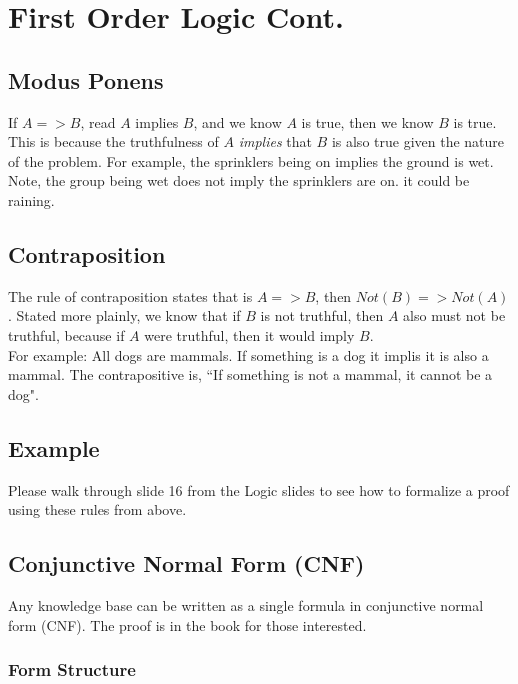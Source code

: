 \documentclass[letterpaper]{article} %
\begin{document}
\section{First Order Logic Cont.}

\subsection{Modus Ponens}

If $A => B$, read $A$ implies $B$, and we know $A$ is true, then we know $B$ is true. This is because the truthfulness of $A$ \textit{implies} that $B$ is also true given the nature of the problem. For example, the sprinklers being on implies the ground is wet. Note, the group being wet does not imply the sprinklers are on. it could be raining.

\subsection{Contraposition}

The rule of contraposition states that is $A => B$, then $Not(B)=> Not(A)$. Stated more plainly, we know that if $B$ is not truthful, then $A$ also must not be truthful, because if $A$ were truthful, then it would imply $B$.\\

For example: All dogs are mammals. If something is a dog it implis it is also a mammal. The contrapositive is, ``If something is not a mammal, it cannot be a dog". 

\subsection{Example}

Please walk through slide 16 from the Logic slides to see how to formalize a proof using these rules from above.

\subsection{Conjunctive Normal Form (CNF)}

Any knowledge base can be written as a single formula in conjunctive normal form (CNF). The proof is in the book for those interested.

\subsubsection{Form Structure}
\end{document}

